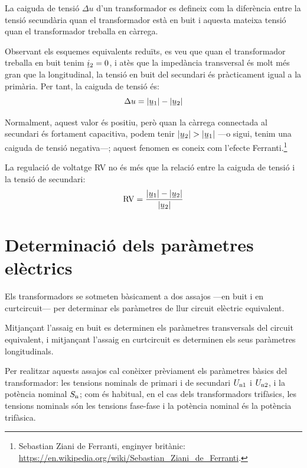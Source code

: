 La caiguda de tensió $\Delta u$ d'un transformador  es defineix com la diferència entre la tensió secundària quan el transformador està en buit i aquesta mateixa tensió quan el transformador treballa en càrrega.

Observant els esquemes equivalents reduïts, es veu que quan el transformador treballa en buit tenim $\cmplx{i}_2=0$, i atès que la impedància transversal és molt més gran que la longitudinal, la tensió en buit del secundari és pràcticament igual a la primària. Per tant, la caiguda de tensió és:
\begin{equation}
    \Delta u = |\cmplx{u}_1| - |\cmplx{u}_2|
\end{equation}

Normalment, aquest valor és positiu, però quan la càrrega connectada al secundari és fortament capacitiva, podem tenir  $|\cmplx{u}_2| > |\cmplx{u}_1|$ ---o sigui, tenim una caiguda de tensió negativa---; aquest fenomen  es coneix com l'efecte Ferranti.\footnote{Sebastian Ziani de Ferranti, enginyer britànic: \href{https://en.wikipedia.org/wiki/Sebastian_Ziani_de_Ferranti}{https:/\!\!/en.wikipedia.org/wiki/Sebastian\_Ziani\_de\_Ferranti}.}

La regulació de voltatge RV no és més que la relació entre la caiguda de tensió i la tensió de secundari:
\begin{equation}
    \text{RV} = \frac{|\cmplx{u}_1| - |\cmplx{u}_2|}{|\cmplx{u}_2|}
\end{equation}

\section{Determinació dels paràmetres elèctrics}\label{sec:determ-param-trafo}

Els transformadors se sotmeten bàsicament a dos assajos ---en
buit i en curtcircuit--- per determinar els paràmetres
de llur circuit elèctric equivalent.

Mitjançant l'assaig en buit es determinen els paràmetres
transversals del circuit equivalent, i mitjançant l'assaig en curtcircuit es determinen els seus paràmetres longitudinals.

Per  realitzar aquests assajos cal conèixer prèviament els paràmetres
bàsics del transformador: les tensions nominals de primari i de
secundari $U_\mathrm{n1}$ i $U_\mathrm{n2}$, i la potència nominal
$S_\mathrm{n}$; com és habitual, en el cas dels transformadors
trifàsics, les tensions nominals són les tensions fase-fase i la
potència nominal és la potència trifàsica.

